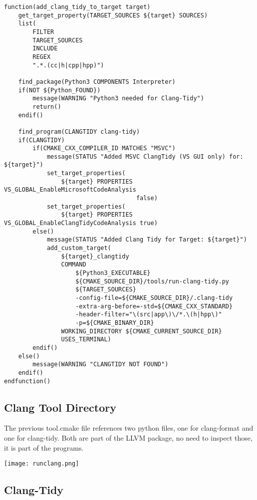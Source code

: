 \documentclass[openany]{report}
\begin{document}
\begin{verbatim}
function(add_clang_tidy_to_target target)
    get_target_property(TARGET_SOURCES ${target} SOURCES)
    list(
        FILTER
        TARGET_SOURCES
        INCLUDE
        REGEX
        ".*.(cc|h|cpp|hpp)")

    find_package(Python3 COMPONENTS Interpreter)
    if(NOT ${Python_FOUND})
        message(WARNING "Python3 needed for Clang-Tidy")
        return()
    endif()

    find_program(CLANGTIDY clang-tidy)
    if(CLANGTIDY)
        if(CMAKE_CXX_COMPILER_ID MATCHES "MSVC")
            message(STATUS "Added MSVC ClangTidy (VS GUI only) for: ${target}")
            set_target_properties(
                ${target} PROPERTIES VS_GLOBAL_EnableMicrosoftCodeAnalysis
                                     false)
            set_target_properties(
                ${target} PROPERTIES VS_GLOBAL_EnableClangTidyCodeAnalysis true)
        else()
            message(STATUS "Added Clang Tidy for Target: ${target}")
            add_custom_target(
                ${target}_clangtidy
                COMMAND
                    ${Python3_EXECUTABLE}
                    ${CMAKE_SOURCE_DIR}/tools/run-clang-tidy.py
                    ${TARGET_SOURCES}
                    -config-file=${CMAKE_SOURCE_DIR}/.clang-tidy
                    -extra-arg-before=-std=${CMAKE_CXX_STANDARD}
                    -header-filter="\(src|app\)\/*.\(h|hpp\)"
                    -p=${CMAKE_BINARY_DIR}
                WORKING_DIRECTORY ${CMAKE_CURRENT_SOURCE_DIR}
                USES_TERMINAL)
        endif()
    else()
        message(WARNING "CLANGTIDY NOT FOUND")
    endif()
endfunction()
\end{verbatim}


\subsection{Clang Tool Directory}

The previous tool.cmake file references two python files, one for clang-format and one for clang-tidy.
Both are part of the LLVM package, no need to inspect those, it is part of the programs.

\begin{center}
    \texttt{[image: runclang.png]}
\end{center}

\subsection{Clang-Tidy}
\end{document}
